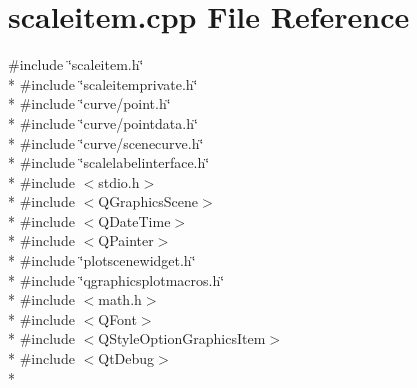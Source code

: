 \section{scaleitem.\+cpp File Reference}
\label{bk3_2axes_2scaleitem_8cpp}
{\ttfamily \#include \char`\"{}scaleitem.\+h\char`\"{}}\\*
{\ttfamily \#include \char`\"{}scaleitemprivate.\+h\char`\"{}}\\*
{\ttfamily \#include \char`\"{}curve/point.\+h\char`\"{}}\\*
{\ttfamily \#include \char`\"{}curve/pointdata.\+h\char`\"{}}\\*
{\ttfamily \#include \char`\"{}curve/scenecurve.\+h\char`\"{}}\\*
{\ttfamily \#include \char`\"{}scalelabelinterface.\+h\char`\"{}}\\*
{\ttfamily \#include $<$stdio.\+h$>$}\\*
{\ttfamily \#include $<$Q\+Graphics\+Scene$>$}\\*
{\ttfamily \#include $<$Q\+Date\+Time$>$}\\*
{\ttfamily \#include $<$Q\+Painter$>$}\\*
{\ttfamily \#include \char`\"{}plotscenewidget.\+h\char`\"{}}\\*
{\ttfamily \#include \char`\"{}qgraphicsplotmacros.\+h\char`\"{}}\\*
{\ttfamily \#include $<$math.\+h$>$}\\*
{\ttfamily \#include $<$Q\+Font$>$}\\*
{\ttfamily \#include $<$Q\+Style\+Option\+Graphics\+Item$>$}\\*
{\ttfamily \#include $<$Qt\+Debug$>$}\\*
